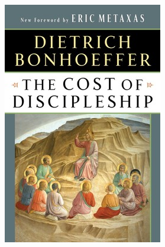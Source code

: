 \documentclass{tufte-handout}
\makeatletter
\newcommand{\varcaption}[2][0pt]{%
  \gsetlength{\@tufte@caption@vertical@offset}{-#1}%
  \gdef\@tufte@stored@varcaption{#2}%
}
\gdef\@tufte@stored@varcaption{} %
\makeatother
\begin{document}
\begin{marginfigure}[-40\baselineskip]
   \includegraphics[width=\linewidth]{images/cost_of_discipleship.jpg}
   \varcaption{\href{https://www.simonandschuster.com/books/The-Cost-of-Discipleship/Dietrich-Bonhoeffer/9780684815008}{Publisher Link}, \href{https://www.amazon.com/gp/product/0684815001/}{Amazon Link}}
\end{marginfigure}
\end{document}
